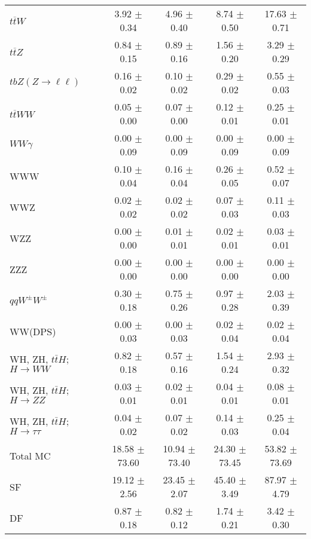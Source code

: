 \begin{tabular}{l|cccc}
                   $t\overline{t}W$ &  3.92 $\pm$  0.34 &  4.96 $\pm$  0.40 &  8.74 $\pm$  0.50 & 17.63 $\pm$  0.71 \\
                   $t\overline{t}Z$ &  0.84 $\pm$  0.15 &  0.89 $\pm$  0.16 &  1.56 $\pm$  0.20 &  3.29 $\pm$  0.29 \\
    $tbZ (Z \rightarrow \ell \ell)$ &  0.16 $\pm$  0.02 &  0.10 $\pm$  0.02 &  0.29 $\pm$  0.02 &  0.55 $\pm$  0.03 \\
                  $t\overline{t}WW$ &  0.05 $\pm$  0.00 &  0.07 $\pm$  0.00 &  0.12 $\pm$  0.01 &  0.25 $\pm$  0.01 \\
                         $WW\gamma$ &  0.00 $\pm$  0.09 &  0.00 $\pm$  0.09 &  0.00 $\pm$  0.09 &  0.00 $\pm$  0.09 \\
                                WWW &  0.10 $\pm$  0.04 &  0.16 $\pm$  0.04 &  0.26 $\pm$  0.05 &  0.52 $\pm$  0.07 \\
                                WWZ &  0.02 $\pm$  0.02 &  0.02 $\pm$  0.02 &  0.07 $\pm$  0.03 &  0.11 $\pm$  0.03 \\
                                WZZ &  0.00 $\pm$  0.00 &  0.01 $\pm$  0.01 &  0.02 $\pm$  0.01 &  0.03 $\pm$  0.01 \\
                                ZZZ &  0.00 $\pm$  0.00 &  0.00 $\pm$  0.00 &  0.00 $\pm$  0.00 &  0.00 $\pm$  0.00 \\
                 $qqW^{\pm}W^{\pm}$ &  0.30 $\pm$  0.18 &  0.75 $\pm$  0.26 &  0.97 $\pm$  0.28 &  2.03 $\pm$  0.39 \\
                            WW(DPS) &  0.00 $\pm$  0.03 &  0.00 $\pm$  0.03 &  0.02 $\pm$  0.04 &  0.02 $\pm$  0.04 \\
WH, ZH, $t\bar{t}H$; $H \rightarrow WW$ &  0.82 $\pm$  0.18 &  0.57 $\pm$  0.16 &  1.54 $\pm$  0.24 &  2.93 $\pm$  0.32 \\
WH, ZH, $t\bar{t}H$; $H \rightarrow ZZ$ &  0.03 $\pm$  0.01 &  0.02 $\pm$  0.01 &  0.04 $\pm$  0.01 &  0.08 $\pm$  0.01 \\
WH, ZH, $t\bar{t}H$; $H \rightarrow \tau\tau$ &  0.04 $\pm$  0.02 &  0.07 $\pm$  0.02 &  0.14 $\pm$  0.03 &  0.25 $\pm$  0.04 \\
\hline\hline
                           Total MC & 18.58 $\pm$ 73.60 & 10.94 $\pm$ 73.40 & 24.30 $\pm$ 73.45 & 53.82 $\pm$ 73.69 \\
\hline
                                 SF & 19.12 $\pm$  2.56 & 23.45 $\pm$  2.07 & 45.40 $\pm$  3.49 & 87.97 $\pm$  4.79 \\
                                 DF &  0.87 $\pm$  0.18 &  0.82 $\pm$  0.12 &  1.74 $\pm$  0.21 &  3.42 $\pm$  0.30 \\

\end{tabular}

